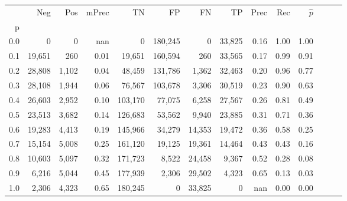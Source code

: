 \begin{tabular}{rrrrrrrrrrrrrr}
\toprule
{} &     Neg &    Pos & mPrec &       TN &       FP &      FN &      TP &  Prec &   Rec & $\hat{p}$ \\
p   &         &        &       &          &          &         &         &       &       &           \\
\midrule
0.0 &       0 &      0 &   nan &        0 &  180,245 &       0 &  33,825 &  0.16 &  1.00 &      1.00 \\
0.1 &  19,651 &    260 &  0.01 &   19,651 &  160,594 &     260 &  33,565 &  0.17 &  0.99 &      0.91 \\
0.2 &  28,808 &  1,102 &  0.04 &   48,459 &  131,786 &   1,362 &  32,463 &  0.20 &  0.96 &      0.77 \\
0.3 &  28,108 &  1,944 &  0.06 &   76,567 &  103,678 &   3,306 &  30,519 &  0.23 &  0.90 &      0.63 \\
0.4 &  26,603 &  2,952 &  0.10 &  103,170 &   77,075 &   6,258 &  27,567 &  0.26 &  0.81 &      0.49 \\
0.5 &  23,513 &  3,682 &  0.14 &  126,683 &   53,562 &   9,940 &  23,885 &  0.31 &  0.71 &      0.36 \\
0.6 &  19,283 &  4,413 &  0.19 &  145,966 &   34,279 &  14,353 &  19,472 &  0.36 &  0.58 &      0.25 \\
0.7 &  15,154 &  5,008 &  0.25 &  161,120 &   19,125 &  19,361 &  14,464 &  0.43 &  0.43 &      0.16 \\
0.8 &  10,603 &  5,097 &  0.32 &  171,723 &    8,522 &  24,458 &   9,367 &  0.52 &  0.28 &      0.08 \\
0.9 &   6,216 &  5,044 &  0.45 &  177,939 &    2,306 &  29,502 &   4,323 &  0.65 &  0.13 &      0.03 \\
1.0 &   2,306 &  4,323 &  0.65 &  180,245 &        0 &  33,825 &       0 &   nan &  0.00 &      0.00 \\
\bottomrule
\end{tabular}
